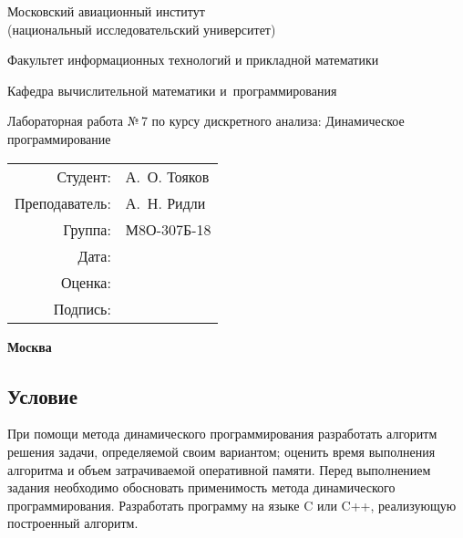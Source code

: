 \documentclass[12pt]{article}
\begin{document}
\thispagestyle{empty}
\begin{center}
	\bfseries

	{\Large Московский авиационный институт\\ (национальный исследовательский университет)

	}

	\vspace{48pt}

	{\large Факультет информационных технологий и прикладной математики
	}

	\vspace{36pt}


	{\large Кафедра вычислительной математики и~программирования

	}


	\vspace{48pt}

	{Лабораторная работа №\,7 по курсу дискретного анализа: Динамическое программирование}

\end{center}

\vspace{72pt}

\begin{flushright}
	\begin{tabular}{rl}
		Студент:       & А.\, О. Тояков   \\
		Преподаватель: & А.\, Н. Ридли \\
		Группа:        & М8О-307Б-18      \\
		Дата:          &                 \\
		Оценка:        &                  \\
		Подпись:       &                  \\
	\end{tabular}
\end{flushright}

\vfill

\begin{center}
	\bfseries
	Москва\\
	\the\year
\end{center}

\newpage

\subsection*{Условие}

При помощи метода динамического программирования разработать алгоритм решения задачи, определяемой своим вариантом; оценить время выполнения алгоритма и объем затрачиваемой оперативной памяти. Перед выполнением задания необходимо обосновать применимость метода динамического программирования.
Разработать программу на языке C или C++, реализующую построенный алгоритм.
\end{document}
